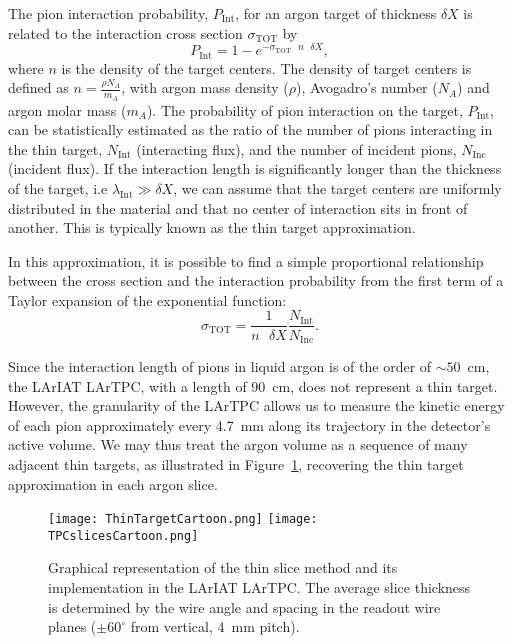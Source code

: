 \documentclass[%
 floatfix,
 reprint,
 twocolumn,
superscriptaddress,
showpacs,preprintnumbers,
 amsmath,amssymb,
 aps,
prd,
]{revtex4-1}
\begin{document}
The pion interaction probability, $P_{\text{Int}}$, for an argon target of thickness $\delta X$  is related to the interaction cross section $\sigma_{\text{TOT}}$ by 
\begin{equation}
P_{\text{Int}} = 1- e^{-\sigma_{\text{TOT}}\text{ } n \text{ }\delta X},
\label{eq:thinTargetXS}
\end{equation}
where $n$ is the density of the target centers. The density of target centers is defined as $n=\frac{\rho N_{A} }{m_A}$, with argon mass density ($\rho$), Avogadro's number ($N_{A}$) and argon molar mass ($m_A$).  The probability of pion interaction on the target, $P_{\text{Int}}$, can be statistically estimated as the ratio of the number of pions interacting in the thin target, $N_{\text{Int}}$ (interacting flux), and the number of incident pions, $N_{\text{Inc}}$ (incident flux). 
If the interaction length is significantly longer than the thickness of the target, i.e $\lambda_{\text{Int}} \gg \delta X$, we can assume that the target centers are uniformly distributed in the material and that no center of interaction sits in front of another. This is typically known as the thin target approximation. 

In this approximation, it is possible to find a simple proportional relationship between the cross section and the interaction probability
from the first term of a Taylor expansion of the exponential function:
 \begin{equation}
 \sigma_{\text{TOT}}  = \frac{1}{n \text{ }\delta X}\frac{N_{\text{Int}}}{N_{\text{Inc}}}.
\label{eq:thinTargetXSSolved}
\end{equation}


Since the interaction length of pions in liquid argon is of the order of $\sim 50$~cm, the LArIAT LArTPC, with a length of 90~cm, does not represent a thin target. However, the granularity of the LArTPC allows us to measure the kinetic energy of each pion approximately every 4.7~mm along its trajectory in the detector's active volume. We may thus treat the argon volume as a sequence of many adjacent thin targets, as illustrated in Figure~\ref{fig:ThinSlice}, recovering the thin target approximation in each argon slice. 

\begin{figure}
\texttt{[image: ThinTargetCartoon.png]}
\texttt{[image: TPCslicesCartoon.png]}
\caption{\label{fig:ThinSlice} Graphical representation of the thin slice method and its implementation in the LArIAT LArTPC. The average slice thickness is determined by the wire angle and spacing in the readout wire planes ($\pm 60^{\circ}$ from vertical, 4~mm pitch). }
\end{figure}
\end{document}
